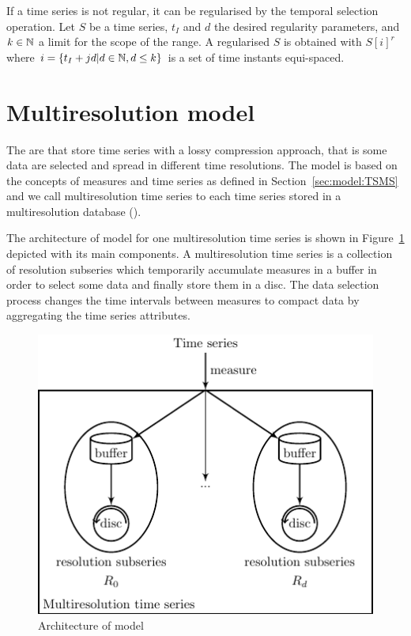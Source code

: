If a time series is not regular, it can be regularised by the temporal
selection operation. Let $S$ be a time series, $t_I$ and $d$ the
desired regularity parameters, and $k\in\mathbb{N}$ a limit for the scope of
the range.  A regularised $S$ is obtained with $S[i]^r$ where $i =
\{t_I+jd | d\in\mathbb{N}, d\leq k \}$ is a set of time instants equi-spaced.





\section{Multiresolution model}
\label{sec:MTSMS}


The  are  that store time series with a lossy
compression approach, that is some data are selected and spread
in different time resolutions. The  model is based on the
concepts of measures and time series as defined in
Section~\ref{sec:model:TSMS} and we call multiresolution time series
to each time series stored in a multiresolution database
().


The architecture of  model for one multiresolution time series is
shown in Figure~\ref{fig:model:mtsdb} depicted with its main
components.  A multiresolution time series is a collection of
resolution subseries which temporarily accumulate measures in a buffer
in order to select some data and finally store them in a
disc. The data selection process changes the time intervals
between measures to compact data by aggregating the time series
attributes.

\begin{figure}
  \centering
  \includegraphics{fig_model_mtsdb.pdf}
  \caption{Architecture of  model}
  \label{fig:model:mtsdb}
\end{figure}


